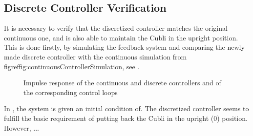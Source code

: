 \subsection{Discrete Controller Verification}\label{ssec:discreteControllerVerification}
It is necessary to verify that the discretized controller matches the original continuous one, and is also able to maintain the Cubli in the upright position. This is done firstly, by simulating the feedback system and comparing the newly made discrete controller with the continuous simulation from figref{fig:continuousControllerSimulation}, see .
%
\begin{figure}[H]
  \centering
  \caption{Impulse response of the continuous and discrete controllers and of the corresponding control loops}
  \label{fig:discreteVsContinuousSimulation}
\end{figure} 

In , the system is given an initial condition of. The discretized controller seems to fulfill the basic requirement of putting back the Cubli in the upright (\si{0^{\circ}}) position. However, ...